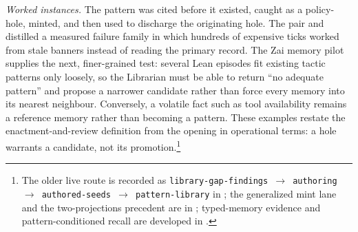 \ifdefined\plopearlyoverview
\else
\emph{Worked instances.} The pattern  was cited before it existed, caught as a policy-hole, minted, and then used to discharge the originating hole.  The pair  and  distilled a measured failure family in which hundreds of expensive ticks worked from stale banners instead of reading the primary record.  The Zai memory pilot supplies the next, finer-grained test: several Lean episodes fit existing tactic patterns only loosely, so the Librarian must be able to return ``no adequate pattern'' and propose a narrower candidate rather than force every memory into its nearest neighbour.  Conversely, a volatile fact such as tool availability remains a reference memory rather than becoming a pattern.  These examples restate the enactment-and-review definition from the opening in operational terms: a hole warrants a candidate, not its promotion.\footnote{The older live route is recorded as \texttt{library-gap-findings $\rightarrow$ authoring $\rightarrow$ authored-seeds $\rightarrow$ pattern-library} in ; the generalized mint lane and the two-projections precedent are in ; typed-memory evidence and pattern-conditioned recall are developed in .}
\fi

